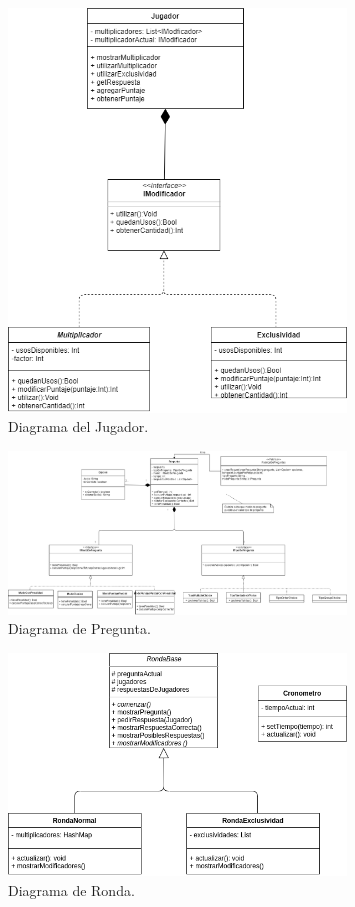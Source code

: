 \documentclass[titlepage,a4paper]{article}
\begin{document}
\begin{figure}[H]
    \centering
    \includegraphics[width=0.8\textwidth]{diagramaJugador.png}
    \caption{\label{fig:class02}Diagrama del Jugador.}
\end{figure}

\begin{figure}[H]
    \centering
    \includegraphics[width=0.8\textwidth]{diagramaPregunta.png}
    \caption{\label{fig:class03}Diagrama de Pregunta.}
\end{figure}

\begin{figure}[H]
    \centering
    \includegraphics[width=0.8\textwidth]{diagramaRonda.png}
    \caption{\label{fig:class04}Diagrama de Ronda.}
\end{figure}
\end{document}
